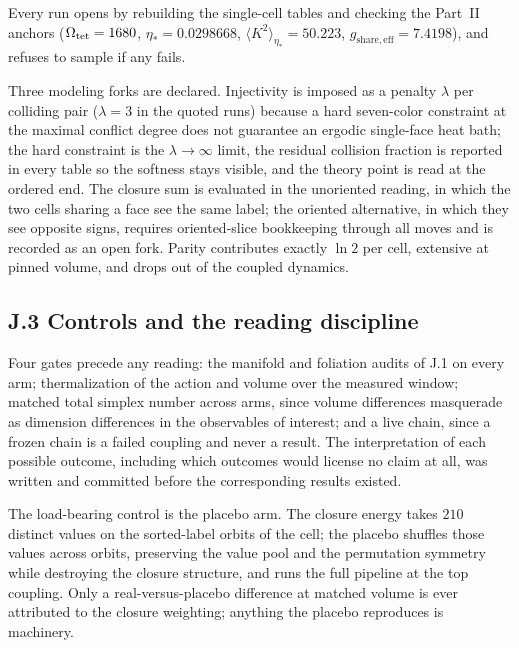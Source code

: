 \documentclass[11pt]{article}
\begin{document}
Every run opens by rebuilding the single-cell tables and checking the Part~II anchors ($\Omega_{\rm tet}=1680$, $\eta_*=0.0298668$, $\langle K^2\rangle_{\eta_*}=50.223$, $g_{\mathrm{share,eff}}=7.4198$), and refuses to sample if any fails.

Three modeling forks are declared. Injectivity is imposed as a penalty $\lambda$ per colliding pair ($\lambda=3$ in the quoted runs) because a hard seven-color constraint at the maximal conflict degree does not guarantee an ergodic single-face heat bath; the hard constraint is the $\lambda\to\infty$ limit, the residual collision fraction is reported in every table so the softness stays visible, and the theory point is read at the ordered end. The closure sum is evaluated in the unoriented reading, in which the two cells sharing a face see the same label; the oriented alternative, in which they see opposite signs, requires oriented-slice bookkeeping through all moves and is recorded as an open fork. Parity contributes exactly $\ln 2$ per cell, extensive at pinned volume, and drops out of the coupled dynamics.

\subsection*{J.3 Controls and the reading discipline}

Four gates precede any reading: the manifold and foliation audits of J.1 on every arm; thermalization of the action and volume over the measured window; matched total simplex number across arms, since volume differences masquerade as dimension differences in the observables of interest; and a live chain, since a frozen chain is a failed coupling and never a result. The interpretation of each possible outcome, including which outcomes would license no claim at all, was written and committed before the corresponding results existed.

The load-bearing control is the placebo arm. The closure energy takes $210$ distinct values on the sorted-label orbits of the cell; the placebo shuffles those values across orbits, preserving the value pool and the permutation symmetry while destroying the closure structure, and runs the full pipeline at the top coupling. Only a real-versus-placebo difference at matched volume is ever attributed to the closure weighting; anything the placebo reproduces is machinery.
\end{document}

